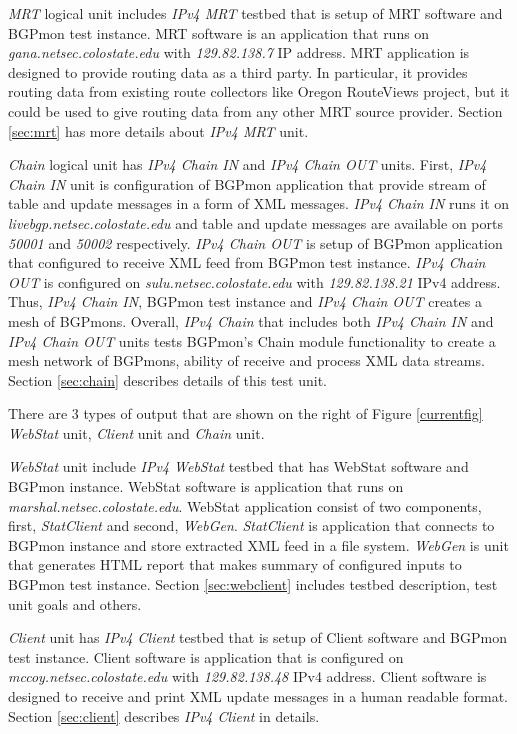 \emph{MRT} logical unit includes \emph{IPv4 MRT} testbed that is setup of MRT software and BGPmon test instance.  MRT software is an application that runs on \emph{gana.netsec.colostate.edu} with \emph{129.82.138.7} IP address. MRT application is designed to provide routing data as a third party. In particular, it provides routing data from existing route collectors like Oregon RouteViews project, but it could be used to give routing data from any other MRT source provider.  Section \ref{sec:mrt} has  more details about \emph{IPv4 MRT} unit.

\emph{Chain} logical unit has \emph{IPv4 Chain IN} and \emph{IPv4 Chain OUT} units. First, \emph{IPv4 Chain IN} unit is configuration of BGPmon application that provide stream of table and update messages in a form of XML messages.  \emph{IPv4 Chain IN} runs it on \emph{livebgp.netsec.colostate.edu} and table and update messages are available on ports \emph{50001} and \emph{50002} respectively.  \emph{IPv4 Chain OUT} is setup of BGPmon application that configured to receive XML feed from BGPmon test instance. \emph{IPv4 Chain OUT} is configured on \emph{sulu.netsec.colostate.edu} with \emph{129.82.138.21} IPv4 address.  Thus, \emph{IPv4 Chain IN}, BGPmon test instance and \emph{IPv4 Chain OUT} creates a mesh of BGPmons.  Overall, \emph{IPv4 Chain} that includes both \emph{IPv4 Chain IN} and \emph{IPv4 Chain OUT} units  tests BGPmon's Chain module functionality to create a mesh network of BGPmons, ability of receive and process XML data streams. Section \ref{sec:chain} describes details of this test unit. 

There are 3 types of output that are shown on the right of Figure \ref{currentfig} \emph{WebStat} unit, \emph{Client} unit and \emph{Chain} unit.  

\emph{WebStat} unit include \emph{IPv4 WebStat} testbed that has WebStat software and BGPmon instance.  WebStat software is application that runs on \emph{marshal.netsec.colostate.edu}. WebStat application consist of two components, first, \emph{StatClient} and second, \emph{WebGen}. \emph{StatClient} is application that connects to BGPmon instance and store extracted XML feed in a file system. \emph{WebGen } is unit that generates HTML report that makes summary of configured inputs to BGPmon test instance.  Section \ref{sec:webclient} includes testbed description, test unit goals and others. 

\emph{Client} unit has \emph{IPv4 Client} testbed that is setup of Client software and BGPmon test instance. Client software is application that is configured on \emph{mccoy.netsec.colostate.edu} with \emph{129.82.138.48} IPv4 address. Client software is designed to receive and print XML update messages in a human readable format. Section \ref{sec:client} describes \emph{IPv4 Client} in details. 
 

